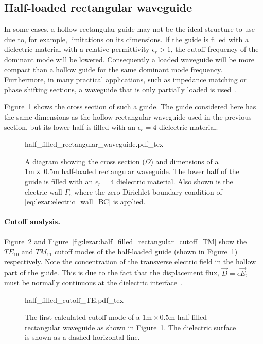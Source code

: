 \subsection{Half-loaded rectangular waveguide}

In some cases, a hollow rectangular guide may not be the ideal
structure to use due to, for example, limitations on its
dimensions. If the guide is filled with a dielectric material with a
relative permittivity $\epsilon_r > 1$, the cutoff frequency of the
dominant mode will be lowered. Consequently a loaded waveguide will be
more compact than a hollow guide for the same dominant mode
frequency. Furthermore, in many practical applications, such as
impedance matching or phase shifting sections, a waveguide that is
only partially loaded is used~\citep{Pozar2005}.

Figure~\ref{fig:lezar:half_filled_rectangular_guide} shows the cross section of such a guide. The guide considered here has the same dimensions as the hollow rectangular waveguide used in the previous section, but its lower half is filled with an $\epsilon_r = 4$ dielectric material.
\begin{figure}
    \centering
    \def\svgwidth{\smallfig}
    {half_filled_rectangular_waveguide.pdf_tex}
    \caption{A diagram showing the cross section ($\Omega$) and dimensions of a $1\text{m}\times~0.5\text{m}$ half-loaded rectangular waveguide. The lower half of the guide is filled with an $\epsilon_r = 4$ dielectric material. Also shown is the electric wall $\Gamma_e$ where the zero Dirichlet boundary condition of \eqref{eq:lezar:electric_wall_BC} is applied.}
    \label{fig:lezar:half_filled_rectangular_guide}
\end{figure}

\paragraph{Cutoff analysis.}

Figure~\ref{fig:lezar:half_filled_rectangular_cutoff_TE} and
Figure~\ref{fig:lezar:half_filled_rectangular_cutoff_TM} show the
$TE_{10}$ and $TM_{11}$ cutoff modes of the half-loaded guide (shown
in Figure~\ref{fig:lezar:half_filled_rectangular_guide})
respectively. Note the concentration of the transverse electric field
in the hollow part of the guide. This is due to the fact that the
displacement flux, $\vec{D} = \epsilon\vec{E}$, must be normally
continuous at the dielectric interface~\citep{Pozar2005, Smith1997}.
\begin{figure}[h]
\centering
  \def\svgwidth{\smallfig}
    {half_filled_cutoff_TE.pdf_tex}
\caption{The first calculated cutoff mode of a $1\text{m}\times0.5\text{m}$ half-filled rectangular waveguide as shown in Figure~\ref{fig:lezar:half_filled_rectangular_guide}. The dielectric surface is shown as a dashed horizontal line.}
\label{fig:lezar:half_filled_rectangular_cutoff_TE}
\end{figure}

